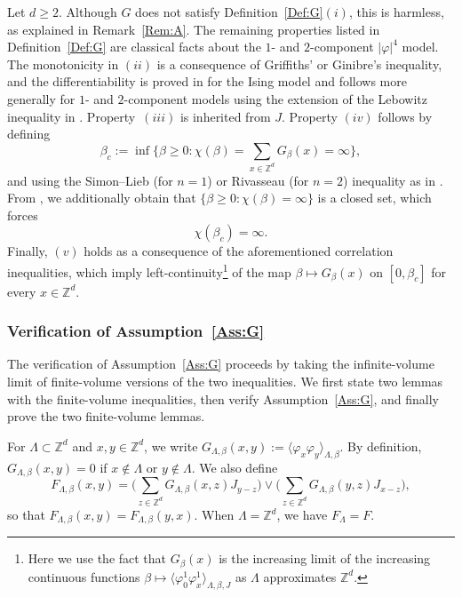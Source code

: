 \documentclass[11pt,a4paper]{article}
\numberwithin{equation}{section}
\theoremstyle{plain}
\theoremstyle{definition}
\newcommand\1{\mathds{1}}
\begin{document}
Let $d\geq 2$.
Although $G$ does not satisfy Definition~\ref{Def:G}$(i)$, this is  harmless, as explained in Remark~\ref{Rem:A}.
The remaining properties listed in Definition~\ref{Def:G} are classical facts
about the $1$- and $2$-component $|\varphi|^4$ model.
The monotonicity in $(ii)$ is a consequence of Griffiths' or Ginibre's inequality, and the differentiability is proved in \cite{Lebo72} for the Ising model and follows more generally for $1$- and $2$-component models using the extension of the Lebowitz inequality in \cite{BFS82}.
 Property~$(iii)$ is inherited from $J$. Property $(iv)$ follows by defining
\begin{equation}
\beta_c:=\inf\Big\{\beta \geq 0: \chi(\beta)=\sum_{x\in \mathbb Z^d}G_\beta(x)=\infty\Big\},
\end{equation}
and using the Simon--Lieb \cite{Simo80,Lieb80} (for $n=1$) or Rivasseau \cite{Riva80} (for $n=2$) inequality as in \cite[Section~2.5]{DT16}. From \cite{DT16}, we additionally obtain that $\{\beta \geq 0: \chi(\beta)=\infty\}$ is a closed set, which forces
\begin{equation}\label{eq:chi infinite for phi4}
\chi(\beta_c)=\infty.
\end{equation}
Finally, $(v)$ holds as a consequence of the aforementioned correlation inequalities, which imply left-continuity\footnote{Here we use
the fact that $G_\beta(x)$ is the increasing limit of the increasing continuous functions $\beta\mapsto \langle \varphi_0^1\varphi_x^1\rangle_{\Lambda,\beta,J}$ as $\Lambda$ approximates $\mathbb Z^d$.} of the map $\beta\mapsto G_\beta(x)$ on $[0,\beta_c]$ for every $x\in \mathbb Z^d$.

\subsubsection{Verification of Assumption~\ref{Ass:G}}

The verification of Assumption~\ref{Ass:G} proceeds by taking the infinite-volume limit of finite-volume versions of the two inequalities.  We first state two lemmas with the finite-volume inequalities, then verify Assumption~\ref{Ass:G}, and finally prove the two finite-volume lemmas.

For $\Lambda\subset \mathbb Z^d$ and $x,y\in \mathbb Z^d$, we write $G_{\Lambda,\beta}(x,y):=\langle \varphi_x\varphi_y\rangle_{\Lambda,\beta}$.
By definition, $G_{\Lambda,\beta}(x,y)=0$ if $x\notin\Lambda$ or $y\notin\Lambda$. We also define
\begin{equation}
F_{\Lambda,\beta}(x,y)=\Big(\sum_{z\in \mathbb Z^d}G_{\Lambda,\beta}(x,z)J_{y-z}\Big)\vee \Big(\sum_{z\in \mathbb Z^d}G_{\Lambda,\beta}(y,z)J_{x-z}\Big),
\end{equation}
so that $F_{\Lambda,\beta}(x,y)=F_{\Lambda,\beta}(y,x)$. When $\Lambda = \mathbb{Z}^d$,
we have $F_{\Lambda} = F$.
\end{document}
